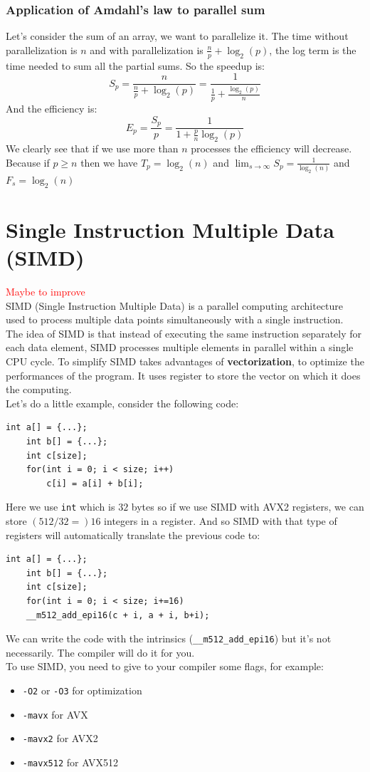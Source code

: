 \documentclass[12pt, openany]{report}
\theoremstyle{definition}
\begin{document}
\subsection{Application of Amdahl's law to parallel sum}
Let's consider the sum of an array, we want to parallelize it. The time without parallelization is $n$ and with parallelization is $\frac{n}{p} + \log_2(p)$, the log term is the time needed to sum all the partial sums. So the speedup is:
\begin{equation}
	S_p = \frac{n}{\frac{n}{p} + \log_2(p)} = \frac{1}{\frac{1}{p} + \frac{\log_2(p)}{n}}
\end{equation}
And the efficiency is:
\begin{equation}
	E_p = \frac{S_p}{p} = \frac{1}{1 + \frac{p}{n}\log_2(p)}
\end{equation}
We clearly see that if we use more than $n$ processes the efficiency will decrease. Because if $p \geq n$ then we have $T_p = \log_2(n)$ and $\lim_{s \to \infty} S_p = \frac{1}{\log_2(n)}$ and $F_s = \log_2(n)$
\chapter{Single Instruction Multiple Data (SIMD)}
\textcolor{red}{Maybe to improve}\\
SIMD (Single Instruction Multiple Data) is a parallel computing architecture used to process multiple data points simultaneously with a single instruction.\\
The idea of SIMD is that instead of executing the same instruction separately for each data element, SIMD processes multiple elements in parallel within a single CPU cycle. To simplify SIMD takes advantages of \textbf{vectorization}, to optimize the performances of the program. It uses register to store the vector on which it does the computing.\\
Let's do a little example, consider the following code:
\begin{lstlisting}[style=CppStyle]
	int a[] = {...};
	int b[] = {...};
	int c[size];
	for(int i = 0; i < size; i++)
		c[i] = a[i] + b[i];
\end{lstlisting}
Here we use \texttt{int} which is $32$ bytes so if we use SIMD with AVX2 registers, we can store $(512/32 =) 16$ integers in a register. And so SIMD with that type of registers will automatically translate the previous code to:
\begin{lstlisting}[style=CppStyle]
	int a[] = {...};
	int b[] = {...};
	int c[size];
	for(int i = 0; i < size; i+=16)
    __m512_add_epi16(c + i, a + i, b+i);
\end{lstlisting}
We can write the code with the intrinsics (\texttt{\_\_m512\_add\_epi16}) but it's not necessarily. The compiler will do it for you.\\
To use SIMD, you need to give to your compiler some flags, for example:
\begin{itemize}
	\item \texttt{-O2} or \texttt{-O3} for optimization
	\item \texttt{-mavx} for AVX
	\item \texttt{-mavx2} for AVX2
	\item \texttt{-mavx512} for AVX512
\end{itemize}
\end{document}
